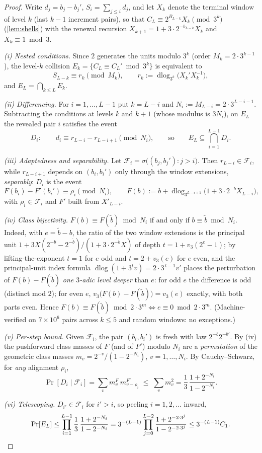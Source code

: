 \documentclass[11pt]{article}
\theoremstyle{plain}
\theoremstyle{definition}
\theoremstyle{remark}
\begin{document}
\begin{proof}
Write $d_j=b_j-b_j'$, $S_i=\sum_{j\le i}d_j$, and let
$X_k$ denote the terminal window of level $k$ (last $k-1$ increment
pairs), so that $C_L\equiv2^{B_{L-k}}X_k\pmod{3^k}$
(\cref{lem:shells}) with the renewal recursion
$X_{k+1}=1+3\cdot2^{-b_{L-k}}X_k$ and $X_k\equiv1\bmod3$.

\emph{(i) Nested conditions.} Since $2$ generates the units modulo $3^k$
(order $M_k=2\cdot3^{k-1}$), the level-$k$ collision
$E_k=\{C_L\equiv C_L'\bmod3^k\}$ is equivalent to
\[
S_{L-k}\equiv r_k\pmod{M_k},
\qquad
r_k:=\operatorname{dlog}_{3^k}\bigl(X_k'X_k^{-1}\bigr),
\]
and $E_L=\bigcap_{k\le L}E_k$.

\emph{(ii) Differencing.} For $i=1,\dots,L-1$ put $k=L-i$ and
$N_i:=M_{L-i}=2\cdot3^{L-i-1}$. Subtracting the conditions at levels $k$
and $k+1$ (whose modulus is $3N_i$), on $E_L$ the revealed pair $i$
satisfies the event
\[
D_i:\qquad
d_i\equiv r_{L-i}-r_{L-i+1}\pmod{N_i},
\qquad\text{so}\qquad
E_L\subseteq\bigcap_{i=1}^{L-1}D_i .
\]

\emph{(iii) Adaptedness and separability.} Let
$\mathcal F_i=\sigma\bigl((b_j,b_j'):j>i\bigr)$. Then
$r_{L-i}\in\mathcal F_i$, while $r_{L-i+1}$ depends on $(b_i,b_i')$ only
through the window extensions, \emph{separably}: $D_i$ is the event
\[
F(b_i)-F'(b_i')\equiv\rho_i\pmod{N_i},
\qquad
F(b):=b+\operatorname{dlog}_{3^{L-i+1}}\bigl(1+3\cdot2^{-b}X_{L-i}\bigr),
\]
with $\rho_i\in\mathcal F_i$ and $F'$ built from $X'_{L-i}$.

\emph{(iv) Class bijectivity.} $F(b)\equiv F(\tilde b)\bmod N_i$ if and
only if $b\equiv\tilde b\bmod N_i$. Indeed, with $e=\tilde b-b$, the
ratio of the two window extensions is the principal unit
$1+3X(2^{-b}-2^{-\tilde b})/(1+3\cdot2^{-\tilde b}X)$ of depth
$t=1+v_3(2^{e}-1)$; by lifting-the-exponent $t=1$ for $e$ odd and
$t=2+v_3(e)$ for $e$ even, and the principal-unit index formula
$\operatorname{dlog}(1+3^t v)=2\cdot3^{\,t-1}v'$ places the perturbation
of $F(b)-F(\tilde b)$ \emph{one $3$-adic level deeper} than $e$: for odd
$e$ the difference is odd (distinct mod $2$); for even $e$,
$v_3\bigl(F(b)-F(\tilde b)\bigr)=v_3(e)$ exactly, with both parts even.
Hence $F(b)\equiv F(\tilde b)\bmod2\cdot3^m\iff e\equiv0\bmod
2\cdot3^m$. (Machine-verified on $7\times10^6$ pairs across
$k\le5$ and random windows: no exceptions.)

\emph{(v) Per-step bound.} Given $\mathcal F_i$, the pair $(b_i,b_i')$ is
fresh with law $2^{-b}2^{-b'}$. By (iv) the pushforward class masses of
$F$ (and of $F'$) modulo $N_i$ are a \emph{permutation} of the geometric
class masses $m_v=2^{-v}/(1-2^{-N_i})$, $v=1,\dots,N_i$. By
Cauchy--Schwarz, for \emph{any} alignment $\rho_i$,
\[
\Pr[D_i\mid\mathcal F_i]
=\sum_v m^{F}_v\,m^{F'}_{v-\rho_i}
\;\le\;\sum_v m_v^2
=\frac13\,\frac{1+2^{-N_i}}{1-2^{-N_i}} .
\]

\emph{(vi) Telescoping.} $D_{i'}\in\mathcal F_i$ for $i'>i$, so peeling
$i=1,2,\dots$ inward,
\[
\Pr[E_L]\le\prod_{i=1}^{L-1}
\frac13\,\frac{1+2^{-N_i}}{1-2^{-N_i}}
=3^{-(L-1)}\prod_{j=0}^{L-2}\frac{1+2^{-2\cdot3^j}}{1-2^{-2\cdot3^j}}
\le3^{-(L-1)}C_1 . \qedhere
\]
\end{proof}
\end{document}
